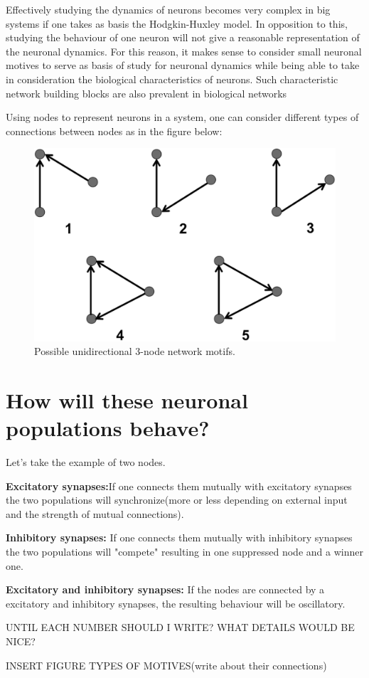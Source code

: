 \documentclass[class={.NoTouch/myProject}, crop=false]{standalone}
\begin{document}
\indent Effectively studying the dynamics of neurons becomes very complex in big systems if one takes as basis the Hodgkin-Huxley model. In opposition to this, studying the behaviour of one neuron will not give a reasonable representation of the neuronal dynamics. For this reason, it makes sense to consider small neuronal motives to serve as basis of study for neuronal dynamics while being able to take in consideration the biological characteristics of neurons. Such characteristic network building blocks are also prevalent in biological networks \cite{Sporns2004}

\indent Using nodes to represent neurons in a system, one can consider different types of connections between nodes as in the figure below:


\begin{figure}[h!]
    \centering
    \includegraphics[width=200 pt]{Pictures/Ana/Motif.png}
    \caption{ Possible unidirectional 3-node network motifs. \cite{Shadizadeh2022}}
    \label{fig:enter-label}
\end{figure}

\section{How will these neuronal populations behave?}

Let's take the example of two nodes. \newline

\textbf{Excitatory synapses:}If one connects them mutually with excitatory synapses the two populations will synchronize(more or less depending on external input and the strength of mutual connections).

\textbf{Inhibitory synapses:} If one connects them mutually with inhibitory synapses the two populations will "compete" resulting in one suppressed node and a winner one.

\textbf{Excitatory and inhibitory synapses:} If the nodes are connected by a excitatory and inhibitory synapses, the resulting behaviour will be oscillatory.

UNTIL EACH NUMBER SHOULD I WRITE? WHAT DETAILS WOULD BE NICE?

INSERT FIGURE
TYPES OF MOTIVES(write about their connections)
\end{document}
